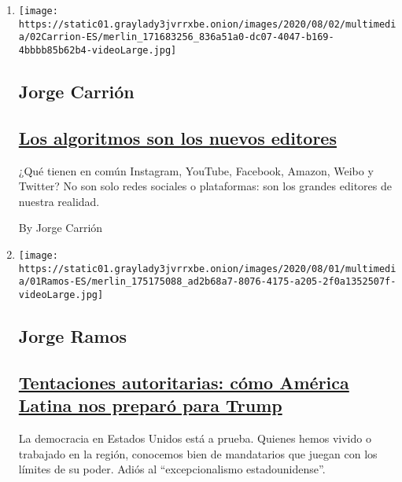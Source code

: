 \begin{enumerate}
\def\labelenumi{\arabic{enumi}.}
\item
  \texttt{[image: https://static01.graylady3jvrrxbe.onion/images/2020/08/02/multimedia/02Carrion-ES/merlin\_171683256\_836a51a0-dc07-4047-b169-4bbbb85b62b4-videoLarge.jpg]}

  \hypertarget{jorge-carriuxf3n}{%
  \subsection{Jorge Carrión}\label{jorge-carriuxf3n}}

  \hypertarget{los-algoritmos-son-los-nuevos-editores}{%
  \subsection{\texorpdfstring{\href{/es/2020/08/02/espanol/opinion/facebook-amazon-instagram.html}{Los
  algoritmos son los nuevos
  editores}}{Los algoritmos son los nuevos editores}}\label{los-algoritmos-son-los-nuevos-editores}}

  ¿Qué tienen en común Instagram, YouTube, Facebook, Amazon, Weibo y
  Twitter? No son solo redes sociales o plataformas: son los grandes
  editores de nuestra realidad.

  By Jorge Carrión
\item
  \texttt{[image: https://static01.graylady3jvrrxbe.onion/images/2020/08/01/multimedia/01Ramos-ES/merlin\_175175088\_ad2b68a7-8076-4175-a205-2f0a1352507f-videoLarge.jpg]}

  \hypertarget{jorge-ramos}{%
  \subsection{Jorge Ramos}\label{jorge-ramos}}

  \hypertarget{tentaciones-autoritarias-cuxf3mo-amuxe9rica-latina-nos-preparuxf3-para-trump}{%
  \subsection{\texorpdfstring{\href{/es/2020/08/01/espanol/opinion/trump-autoritarismo.html}{Tentaciones
  autoritarias: cómo América Latina nos preparó para
  Trump}}{Tentaciones autoritarias: cómo América Latina nos preparó para Trump}}\label{tentaciones-autoritarias-cuxf3mo-amuxe9rica-latina-nos-preparuxf3-para-trump}}

  La democracia en Estados Unidos está a prueba. Quienes hemos vivido o
  trabajado en la región, conocemos bien de mandatarios que juegan con
  los límites de su poder. Adiós al ``excepcionalismo estadounidense''.


\end{enumerate}
